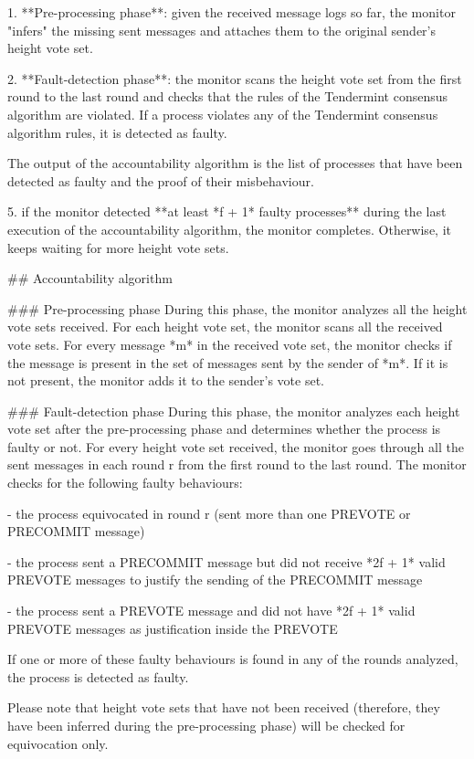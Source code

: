 \documentclass[a4paper,11pt,oneside]{report}
\begin{document}
\begin{markdown}
    1. **Pre-processing phase**: given the received message logs so far, the monitor "infers" the missing sent messages and attaches them to the original sender's height vote set.

    2. **Fault-detection phase**: the monitor scans the height vote set from the first round to the last round and checks that the rules of the Tendermint consensus algorithm are violated. If a process violates any of the Tendermint consensus algorithm rules, it is detected as faulty. 

    The output of the accountability algorithm is the list of processes that have been detected as faulty and the proof of their misbehaviour.
  
5. if the monitor detected **at least *f + 1* faulty processes** during the last execution of the accountability algorithm, the monitor completes. Otherwise, it keeps waiting for more height vote sets.

## Accountability algorithm

### Pre-processing phase
During this phase, the monitor analyzes all the height vote sets received. 
For each height vote set, the monitor scans all the received vote sets. 
For every message *m* in the received vote set, the monitor checks if the message is present in the set of messages sent by the sender of *m*. If it is not present, the monitor adds it to the sender's vote set.   

### Fault-detection phase
During this phase, the monitor analyzes each height vote set after the pre-processing phase and determines whether the process is faulty or not.
For every height vote set received, the monitor goes through all the sent messages in each round r from the first round to the last round. The monitor checks for the following faulty behaviours:

- the process equivocated in round r (sent more than one PREVOTE or PRECOMMIT message)

- the process sent a PRECOMMIT message but did not receive *2f + 1* valid PREVOTE messages to justify the sending of the PRECOMMIT message

- the process sent a PREVOTE message and did not have *2f + 1* valid PREVOTE messages as justification inside the PREVOTE

If one or more of these faulty behaviours is found in any of the rounds analyzed, the process is detected as faulty.

Please note that height vote sets that have not been received (therefore, they have been inferred during the pre-processing phase) will be checked for equivocation only.


\end{markdown}
\end{document}
